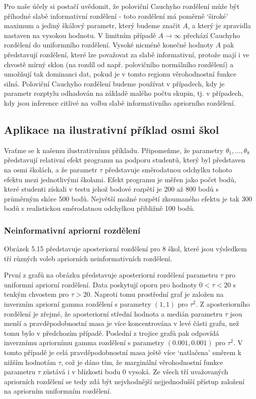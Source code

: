Pro naše účely si postačí uvědomit, že poloviční Cauchyho rozdělení může být příhodné slabě informativní rozdělení - toto rozdělení má poměrně `široké' maximum a jediný škálový parametr, který budeme značit $A$, a který je zpravidla nastaven na vysokou hodnotu. V limitním případě $A \rightarrow \infty$  přechází Cauchyho rozdělení do uniformního rozdělení. Vysoké nicméně konečné hodnoty $A$ pak představují rozdělení, které lze považovat za slabě informativní, protože mají i ve chvostě mírný sklon (na rozdíl od např. polovičního normálního rozdělení) a umožňují tak dominanci dat, pokud je v tomto regionu věrohodnostní funkce silná. Poloviční Cauchyho rozdělení budeme používat v případech, kdy je parametr rozptylu odhadován na základě malého počtu skupin, tj. v případech, kdy jsou inference citlivé na volbu slabě informativního apriorního rozdělení.

\subsection{Aplikace na ilustrativní příklad osmi škol}

Vraťme se k našemu ilustrativnímu příkladu. Připomeňme, že parametry $\theta_1, ..., \theta_8$ představují relativní efekt programu na podporu studentů, který byl představen na osmi školách, a že parametr $\tau$ představuje směrodatnou odchylku tohoto efektu mezi jednotlivými školami. Efekt programu je měřen jako počet bodů, které studenti získali v testu jehož bodové rozpětí je 200 až 800 bodů s průměrným skóre 500 bodů. Největší možné rozpětí zkoumaného efektu je tak 300 bodů s realistickou směrodatnou odchylkou přibližně 100 bodů.

\subsubsection{Neinformativní apriorní rozdělení}

Obrázek 5.15 představuje aposteriorní rozdělení pro 8 škol, které jsou výsledkem tří různých voleb apriorních neinformativních rozdělení.


První z grafů na obrázku představuje aposteriorní rozdělení parametru $\tau$ pro uniformní apriorní rozdělení. Data poskytují oporu pro hodnoty $0 < \tau < 20$ s tenkým chvostem pro $\tau > 20$. Naproti tomu prostřední graf je založen na inverzním apriorní gamma rozdělení s parametry $(1, 1)$ pro $\tau^2$. Z aposteriorního rozdělení je zřejmé, že aposteriorní střední hodnota a medián parametru $\tau$ jsou menší a pravděpodobnostní masa je více koncentrována v levé části grafu, než tomu bylo v předchozím případě. Poslední z trojice grafů pak odpovídá inverznímu apriornímu gamma rozdělení s parametry $(0.001, 0.001)$ pro $\tau^2$. V tomto případě je celá pravděpodobnostní masa ještě více `natlačena' směrem k nižším hodnotám $\tau$, což je dáno tím, že marginální věrohodnostní funkce parametru $\tau$ zůstává i v blízkosti bodu 0 vysoká. Ze všech tří uvažovaných apriorních rozdělení se tedy zdá být nejvhodnější nejjednodušší přístup založení na apriorním uniformním rozdělení.

